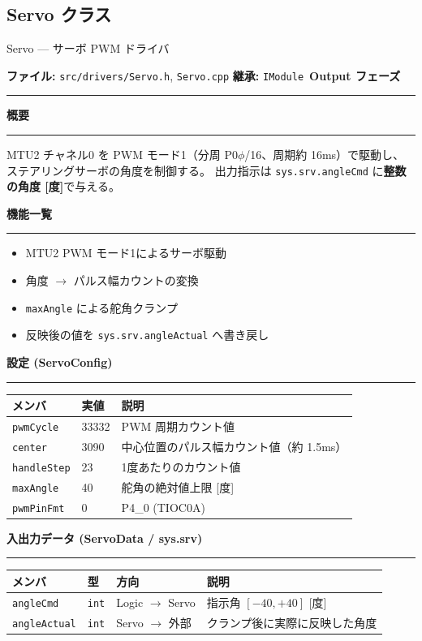 \documentclass[a4paper,11pt,dvipdfmx]{jsarticle}
\makeatletter
\newcommand{\apisection}[1]{%
  \par\addvspace{4mm}%
  {\normalsize\bfseries\color{headerblue} #1}%
  \par\vspace{-1mm}%
  {\color{accentblue!40}\rule{\linewidth}{0.5pt}}%
  \par\nobreak\vspace{2mm}%
  \@afterheading
}
\newcommand{\phasebadge}[1]{%
  \colorbox{accentblue!10}{\small\bfseries\color{accentblue!80!black}\,#1\,}%
}
\makeatother
\begin{document}
\subsection{Servo クラス}\label{sec:api-servo}

\begin{apibox}{Servo --- サーボ PWM ドライバ}

\textbf{ファイル:} \texttt{src/drivers/Servo.h}, \texttt{Servo.cpp} \hfill
\textbf{継承:} \texttt{IModule} \hfill
\phasebadge{Output フェーズ}

\vspace{2mm}\hrule\vspace{2mm}

\apisection{概要}

MTU2 チャネル0 を PWM モード1（分周 P0$\phi$/16、周期約 16ms）で駆動し、
ステアリングサーボの角度を制御する。
出力指示は \texttt{sys.srv.angleCmd} に\textbf{整数の角度 [度]}で与える。

\apisection{機能一覧}

\begin{itemize}[nosep]
  \item MTU2 PWM モード1によるサーボ駆動
  \item 角度 $\rightarrow$ パルス幅カウントの変換
  \item \texttt{maxAngle} による舵角クランプ
  \item 反映後の値を \texttt{sys.srv.angleActual} へ書き戻し
\end{itemize}

\apisection{設定 (ServoConfig)}

\begin{tabularx}{\textwidth}{l l X}
\toprule
\textbf{メンバ} & \textbf{実値} & \textbf{説明} \\
\midrule
\texttt{pwmCycle}   & 33332 & PWM 周期カウント値 \\
\texttt{center}     & 3090  & 中心位置のパルス幅カウント値（約 1.5ms） \\
\texttt{handleStep} & 23    & 1度あたりのカウント値 \\
\texttt{maxAngle}   & 40    & 舵角の絶対値上限 [度] \\
\texttt{pwmPinFmt}  & 0     & P4\_0 (TIOC0A) \\
\bottomrule
\end{tabularx}

\apisection{入出力データ (ServoData / sys.srv)}

\begin{tabularx}{\textwidth}{l l l X}
\toprule
\textbf{メンバ} & \textbf{型} & \textbf{方向} & \textbf{説明} \\
\midrule
\texttt{angleCmd}    & \texttt{int} & Logic $\rightarrow$ Servo & 指示角 $[-40, +40]$ [度] \\
\texttt{angleActual} & \texttt{int} & Servo $\rightarrow$ 外部  & クランプ後に実際に反映した角度 \\
\bottomrule
\end{tabularx}


\end{apibox}
\end{document}
